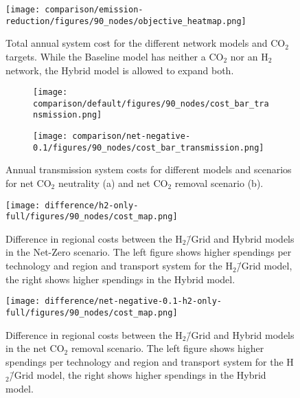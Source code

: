 \documentclass[twocolumn]{article}
\newcommand{\COtwo}{CO$_2$}
\newcommand{\Htwo}{H$_2$}
\newcommand{\Hgrid}{H$_2$\=/Grid}
\newcommand{\modBase}{Baseline model}
\newcommand{\modH}{H$_2$\=/Grid model}
\newcommand{\modHybrid}{Hybrid model}
\newcommand{\carbon}{CO$_2$}
\begin{document}
\begin{figure}[h!]
    \centering
    \texttt{[image: comparison/emission-reduction/figures/90\_nodes/objective\_heatmap.png]}
    \caption{Total annual system cost for the different network models and \COtwo{} targets. While the \modBase{} has neither a \COtwo{} nor an \Htwo{} network, the \modHybrid{} is allowed to expand both.}
    \label{fig:objective_heatmap}
\end{figure}

\begin{figure}[ht]
    \centering
    \begin{subfigure}{.5\textwidth}
        \centering
        \texttt{[image: comparison/default/figures/90\_nodes/cost\_bar\_transmission.png]}
        \caption{}
        \label{fig:cost_bar_transmission}
    \end{subfigure}%
    \begin{subfigure}{.5\textwidth}
        \centering
        \texttt{[image: comparison/net-negative-0.1/figures/90\_nodes/cost\_bar\_transmission.png]}
        \caption{}
        \label{fig:cost_bar_transmission_nn}
    \end{subfigure}
    \caption{Annual transmission system costs for different models and scenarios for net \carbon{} neutrality (a) and net \carbon{} removal scenario (b).}
\end{figure}


\begin{figure}[ht!]
    \centering
    \texttt{[image: difference/h2-only-full/figures/90\_nodes/cost\_map.png]}
    \caption{Difference in regional costs between the \Hgrid{} and \modHybrid{}s in the Net-Zero scenario. The left figure shows higher spendings per technology and region and transport system for the \modH{}, the right shows higher spendings in the \modHybrid{}.}
    \label{fig:cost_map_difference}
\end{figure}


\begin{figure}[ht!]
    \centering
    \texttt{[image: difference/net-negative-0.1-h2-only-full/figures/90\_nodes/cost\_map.png]}
    \caption{Difference in regional costs between the \Hgrid{} and \modHybrid{}s in the net \carbon{} removal scenario. The left figure shows higher spendings per technology and region and transport system for the \modH{}, the right shows higher spendings in the \modHybrid{}.}
    \label{fig:cost_map_difference_nn}
\end{figure}
\end{document}
